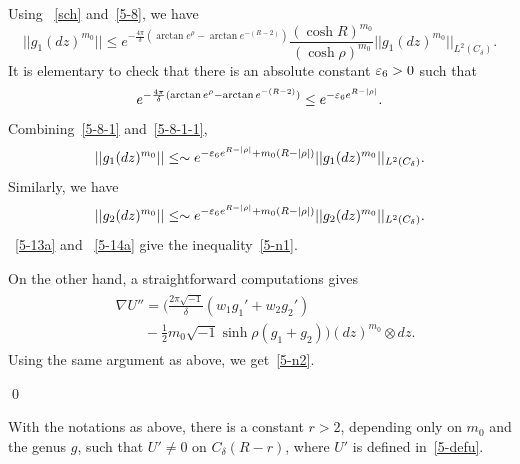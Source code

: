 Using ~\eqref{sch} and~\eqref{5-8}, we have
\begin{equation}\label{5-8-1}
||g_1 (dz)^{m_0}||\leq e^{-\frac{4\pi}{\delta}(\arctan e^\rho-\arctan
e^{-(R-2)})}
\frac{(\cosh R)^{m_0}}{(\cosh\rho)^{m_0}}
||g_1(dz)^{m_0}||_{L^2(C_\delta)}.
\end{equation}
It is elementary to check that there is an absolute constant
$\varepsilon_6>0$ such that
\begin{equation}\label{5-8-1-1}
e^{-\frac{4\pi}{\delta}(\arctan e^\rho-\arctan e^{-(R-2)})}
\leq e^{-\varepsilon_6e^{R-|\rho|}}.
\end{equation}
Combining~\eqref{5-8-1} and~\eqref{5-8-1-1}, 
\begin{equation}\label{5-13a}
||g_1(dz)^{m_0}||\leq
\sim e^{-\varepsilon_6e^{R-|\rho|}+m_0(R-|\rho|)}
||g_1(dz)^{m_0}||_{L^2(C_\delta)}.
\end{equation}
Similarly, we have
\begin{equation}\label{5-14a}
||g_2(dz)^{m_0}||\leq
\sim e^{-\varepsilon_6e^{R-|\rho|}+m_0(R-|\rho|)}
||g_2(dz)^{m_0}||_{L^2(C_\delta)}.
\end{equation}
~\eqref{5-13a} and
~\eqref{5-14a} give the inequality~\eqref{5-n1}.

On the other hand, a straightforward
computations gives
\begin{align}
\begin{split}
&\nabla U''=(\frac{2\pi\sqrt{-1}}{\delta}(w_1 g_1'+w_2
g_2')\\
&\qquad -\frac 12 m_0\sqrt{-1}\sinh\rho (g_1+ g_2))
(dz)^{m_0}\otimes dz.
\end{split}
\end{align}
Using the same argument as above, we get~\eqref{5-n2}.

\qed



\begin{lemma}\label{lem51}
With the notations as above, 
there is a  constant $r>2$, depending only on $m_0$ and the genus
$g$, such
that
 $U'\neq 0$ on $C_\delta(R-r)$, where $U'$ is defined in~\eqref{5-defu}.
\end{lemma}


